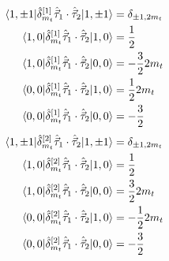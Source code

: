 \documentclass[10pt]{article}
\begin{document}
\begin{multicols}{2}
\noindent
\begin{align*}
	\braket{ 1, \pm 1 | \hat{\delta}_{m_t}^{[1]} \hat{\vec{\tau}}_{1} \cdot \hat{\vec{\tau}}_{2} | 1, \pm 1} &= \delta_{ \pm 1,2m_t}  \\
	\braket{ 1,0 | \hat{\delta}_{m_t}^{[1]} \hat{\vec{\tau}}_{1} \cdot \hat{\vec{\tau}}_{2} | 1,0} &= \frac{1}{2} \\
	\braket{ 1,0 | \hat{\delta}_{m_t}^{[1]} \hat{\vec{\tau}}_{1} \cdot \hat{\vec{\tau}}_{2} | 0,0} &=-\frac{3}{2} 2m_t \\
	\braket{ 0,0 | \hat{\delta}_{m_t}^{[1]} \hat{\vec{\tau}}_{1} \cdot \hat{\vec{\tau}}_{2} | 1,0} &= \frac{1}{2} 2m_t \\
	\braket{ 0,0 | \hat{\delta}_{m_t}^{[1]} \hat{\vec{\tau}}_{1} \cdot \hat{\vec{\tau}}_{2} | 0,0} &=-\frac{3}{2}
\end{align*}
\begin{align*}
	\braket{ 1, \pm 1 | \hat{\delta}_{m_t}^{[2]} \hat{\vec{\tau}}_{1} \cdot \hat{\vec{\tau}}_{2} | 1, \pm 1} &= \delta_{ \pm 1,2m_t}  \\
	\braket{ 1,0 | \hat{\delta}_{m_t}^{[2]} \hat{\vec{\tau}}_{1} \cdot \hat{\vec{\tau}}_{2} | 1,0} &= \frac{1}{2} \\
	\braket{ 1,0 | \hat{\delta}_{m_t}^{[2]} \hat{\vec{\tau}}_{1} \cdot \hat{\vec{\tau}}_{2} | 0,0} &= \frac{3}{2} 2m_t \\
	\braket{ 0,0 | \hat{\delta}_{m_t}^{[2]} \hat{\vec{\tau}}_{1} \cdot \hat{\vec{\tau}}_{2} | 1,0} &=-\frac{1}{2} 2m_t \\
	\braket{ 0,0 | \hat{\delta}_{m_t}^{[2]} \hat{\vec{\tau}}_{1} \cdot \hat{\vec{\tau}}_{2} | 0,0} &=-\frac{3}{2}
\end{align*}
\end{multicols}
\end{document}
